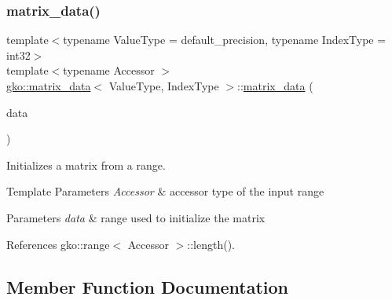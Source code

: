 \subsubsection{\texorpdfstring{matrix\+\_\+data()}{matrix\_data()}\hspace{0.1cm}{\footnotesize\ttfamily [6/6]}}
{\footnotesize\ttfamily template$<$typename Value\+Type = default\+\_\+precision, typename Index\+Type = int32$>$ \\
template$<$typename Accessor $>$ \\
\hyperlink{structgko_1_1matrix__data}{gko\+::matrix\+\_\+data}$<$ Value\+Type, Index\+Type $>$\+::\hyperlink{structgko_1_1matrix__data}{matrix\+\_\+data} (\begin{DoxyParamCaption}\item[{const \hyperlink{classgko_1_1range}{range}$<$ Accessor $>$ \&}]{data }\end{DoxyParamCaption})}



Initializes a matrix from a range. 


\begin{DoxyTemplParams}{Template Parameters}
{\em Accessor} & accessor type of the input range\\
\hline
\end{DoxyTemplParams}

\begin{DoxyParams}{Parameters}
{\em data} & range used to initialize the matrix \\
\hline
\end{DoxyParams}


References gko\+::range$<$ Accessor $>$\+::length().



\subsection{Member Function Documentation}
\mbox{\label{structgko_1_1matrix__data_a84056e4ef41884be328ec78554074df1}} 
